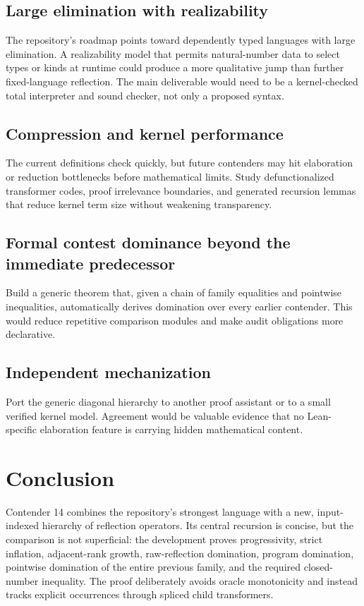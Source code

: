\documentclass[11pt]{article}
\theoremstyle{definition}
\begin{document}
\subsection{Large elimination with realizability}
The repository's roadmap points toward dependently typed languages with large elimination.  A realizability model that permits natural-number data to select types or kinds at runtime could produce a more qualitative jump than further fixed-language reflection.  The main deliverable would need to be a kernel-checked total interpreter and sound checker, not only a proposed syntax.

\subsection{Compression and kernel performance}
The current definitions check quickly, but future contenders may hit elaboration or reduction bottlenecks before mathematical limits.  Study defunctionalized transformer codes, proof irrelevance boundaries, and generated recursion lemmas that reduce kernel term size without weakening transparency.

\subsection{Formal contest dominance beyond the immediate predecessor}
Build a generic theorem that, given a chain of family equalities and pointwise inequalities, automatically derives domination over every earlier contender.  This would reduce repetitive comparison modules and make audit obligations more declarative.

\subsection{Independent mechanization}
Port the generic diagonal hierarchy to another proof assistant or to a small verified kernel model.  Agreement would be valuable evidence that no Lean-specific elaboration feature is carrying hidden mathematical content.

\section{Conclusion}

Contender 14 combines the repository's strongest language with a new, input-indexed hierarchy of reflection operators.  Its central recursion is concise, but the comparison is not superficial: the development proves progressivity, strict inflation, adjacent-rank growth, raw-reflection domination, program domination, pointwise domination of the entire previous family, and the required closed-number inequality.  The proof deliberately avoids oracle monotonicity and instead tracks explicit occurrences through spliced child transformers.
\end{document}
